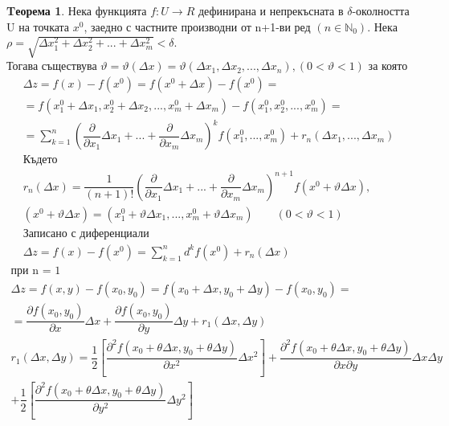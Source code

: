 \documentclass[a4paper,fleqn,12pt]{article}
\theoremstyle{definition}
\newtheorem{theorem}{Tеорема}[subsection]
\begin{document}
\begin{theorem}
Нека функцията $f: U \to R$ дефинирана и непрекъсната в $\delta$-околността U на точката $x^0$, заедно с частните производни от n+1-ви ред $(n \in \mathbb{N}_0)$. Нека $\rho = \sqrt{\Delta x_1 ^2 + \Delta x_2 ^2 + ... + \Delta x_m ^2} < \delta$. \\
Тогава съществува $\vartheta = \vartheta(\Delta x) = \vartheta(\Delta x_1, \Delta x_2, ..., \Delta x_n) ,  (0 < \vartheta < 1)$ за която
\begin{gather*}
\Delta z = f(x) - f(x^0) = f(x^0 + \Delta x) - f(x^0) =\\
= f(x_1^0 + \Delta x_1, x_2^0 + \Delta x_2,...,x_m^0 + \Delta x_m) - f(x_1^0, x_2^0, ..., x_m ^0) = \\
=\sum_{k=1} ^ n \left( \dfrac{\partial}{\partial x_1} \Delta x_1 + ... + \dfrac{\partial}{\partial x_m} \Delta x_m\right)^k f(x_1^0,..., x_m^0) + r_n(\Delta x_1, ... , \Delta x_m)\\
\text{Където}\\
r_n(\Delta x) = \dfrac{1}{(n+1)!} \left(\dfrac{\partial}{\partial x_1} \Delta x_1 + ... + \dfrac{\partial}{\partial x_m} \Delta x_m  \right)^{n+1} f(x^0 + \vartheta \Delta x),\\
(x^0 + \vartheta \Delta x) = (x_1^0 + \vartheta\Delta x_1 , ... ,x_m^0 + \vartheta\Delta x_m) \qquad (0 < \vartheta < 1) \\
\text{Записано с диференциали}\\
\Delta z = f(x) - f(x^0) = \sum_{k=1} ^n d^k f(x^0) + r_n(\Delta x)
\end{gather*}
\begin{gather*}
\text{при n = 1}\\
\Delta z = f(x,y) - f(x_0, y_0) = f(x_0 + \Delta x, y_0 + \Delta y) - f(x_0, y_0) = \\
= \dfrac{\partial f(x_0, y_0) }{\partial x} \Delta x + \dfrac{\partial f(x_0, y_0) }{\partial y} \Delta y + r_1(\Delta x,\Delta y)\\
r_1(\Delta x,\Delta y) = \dfrac{1}{2} \left[ \dfrac{\partial^2 f(x_0 + \theta \Delta x, y_0 + \theta \Delta y)}{\partial x^2} \Delta x^2 \right] + \dfrac{\partial^2 f(x_0 + \theta \Delta x, y_0 + \theta \Delta y)}{\partial x \partial y } \Delta x \Delta y \\
 +\dfrac{1}{2} \left[ \dfrac{\partial^2 f(x_0 + \theta \Delta x, y_0 + \theta \Delta y)}{\partial y^2} \Delta y^2 \right]
\end{gather*}
\end{theorem}
\end{document}
